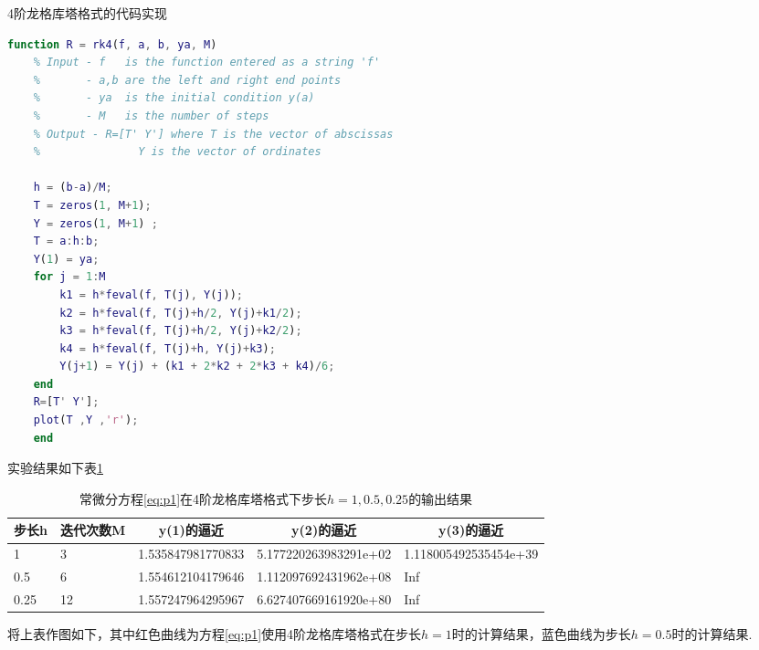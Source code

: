 \documentclass[UTF8]{ctexart}
\begin{document}
4阶龙格库塔格式的代码实现
\begin{lstlisting}[language=matlab]
	function R = rk4(f, a, b, ya, M)
	% Input - f   is the function entered as a string 'f'
	%       - a,b are the left and right end points
	%       - ya  is the initial condition y(a)
	%       - M   is the number of steps
	% Output - R=[T' Y'] where T is the vector of abscissas
	%               Y is the vector of ordinates
	
	h = (b-a)/M;
	T = zeros(1, M+1);
	Y = zeros(1, M+1) ;
	T = a:h:b;
	Y(1) = ya;
	for j = 1:M
		k1 = h*feval(f, T(j), Y(j));
		k2 = h*feval(f, T(j)+h/2, Y(j)+k1/2);
		k3 = h*feval(f, T(j)+h/2, Y(j)+k2/2);
		k4 = h*feval(f, T(j)+h, Y(j)+k3);
		Y(j+1) = Y(j) + (k1 + 2*k2 + 2*k3 + k4)/6;
	end
	R=[T' Y'];
	plot(T ,Y ,'r');
	end
\end{lstlisting}
实验结果如下表\ref{table:rk}\\
\begin{table}[h]
	\centering
	\caption{常微分方程\ref{eq:p1}在4阶龙格库塔格式下步长$h=1, 0.5, 0.25$的输出结果}
	\label{table:rk}
	\begin{tabular}{lllll}
		\hline
		\multicolumn{1}{c}{\textbf{步长h}} & \multicolumn{1}{c}{\textbf{迭代次数M}} & \multicolumn{1}{c}{\textbf{y(1)的逼近}} & \multicolumn{1}{c}{\textbf{y(2)的逼近}} & \multicolumn{1}{c}{\textbf{y(3)的逼近}} \\ \hline
		1                                & 3                                  & 1.535847981770833                    & 5.177220263983291e+02                & 1.118005492535454e+39                \\ \hline
		0.5                              & 6                                  & 1.554612104179646                    & 1.112097692431962e+08                & Inf                                  \\ \hline
		0.25                             & 12                                 & 1.557247964295967                    & 6.627407669161920e+80                & Inf                                  \\ \hline
	\end{tabular}
\end{table}
将上表作图如下，其中红色曲线为方程\ref{eq:p1}使用4阶龙格库塔格式在步长$h=1$时的计算结果，蓝色曲线为步长$h=0.5$时的计算结果.
\end{document}
